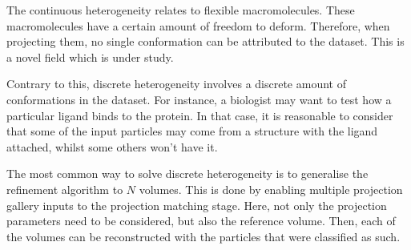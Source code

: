 \documentclass[../main.tex]{subfiles}
\begin{document}
The continuous heterogeneity relates to flexible macromolecules. These macromolecules have a certain amount of freedom to deform. Therefore, when projecting them, no single conformation can be attributed to the dataset. This is a novel field which is under study.

Contrary to this, discrete heterogeneity involves a discrete amount of conformations in the dataset. For instance, a biologist may want to test how a particular ligand binds to the protein. In that case, it is reasonable to consider that some of the input particles may come from a structure with the ligand attached, whilst some others won't have it.

The most common way to solve discrete heterogeneity is to generalise the refinement algorithm to $N$ volumes. This is done by enabling multiple projection gallery inputs to the projection matching stage. Here, not only the projection parameters need to be considered, but also the reference volume. Then, each of the volumes can be reconstructed with the particles that were classified as such.
\end{document}
